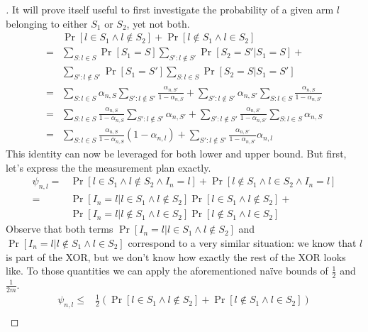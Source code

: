 \begin{proof}[]
  It will prove itself useful to first investigate the probability of a given
  arm $l$ belonging to either $S_1$ or $S_2$, yet not both.
  \begin{align}
    &\Pr[l \in S_1 \wedge l \notin S_2] + \Pr[l \notin S_1 \wedge l \in S_2]  \\
    =& \sum_{S: l \in S} \Pr[S_1 = S] \sum_{S': l \notin S'} \Pr[S_2 = S' | S_1
        = S] + \\
    & \sum_{S': l \notin S'} \Pr[S_1 = S'] \sum_{S: l \in S} \Pr[S_2 = S | S_1
        = S'] \\
    =& \sum_{S: l \in S} \alpha_{n, S} \sum_{S': l \notin S'} \frac{\alpha_{n,
        S'}}{1 - \alpha_{n, S}} + \sum_{S': l \notin S'} \alpha_{n, S'}
        \sum_{S: l \in S} \frac{\alpha_{n, S}}{1 - \alpha_{n, S'}}\\
    =& \sum_{S: l \in S} \frac{\alpha_{n, S}}{1 - \alpha_{n, S}} \sum_{S': l
        \notin S'} \alpha_{n, S'} + \sum_{S': l \notin S'} \frac{\alpha_{n,
        S'}}{1 - \alpha_{n, S'}} \sum_{S: l \in S} \alpha_{n, S}\\
    =& \sum_{S: l \in S} \frac{\alpha_{n, S}}{1 - \alpha_{n, S}} (1 -
        \alpha_{n, l}) +  \sum_{S': l \notin S'} \frac{\alpha_{n, S'}}{1 -
        \alpha_{n, S'}} \alpha_{n, l}
  \end{align}
  This identity can now be leveraged for both lower and upper bound. But first,
  let's express the the measurement plan exactly.
  \begin{align}
    \psi_{n, l} =& \Pr[l \in S_1 \wedge l \notin S_2 \wedge I_n = l] + \Pr[l
        \notin S_1 \wedge l \in S_2 \wedge I_n = l] \\
    =& \Pr[I_n = l | l \in S_1 \wedge l \notin S_2] \Pr[l \in S_1 \wedge l
        \notin S_2] + \\
    & \Pr[I_n = l | l \notin S_1 \wedge l \in S_2] \Pr[l \notin S_1 \wedge l
        \in S_2]
  \end{align}
  Observe that both terms $\Pr[I_n = l | l \in S_1 \wedge l \notin S_2]$ and
  $\Pr[I_n = l | l \notin S_1 \wedge l \in S_2]$ correspond to a very similar
  situation: we know that $l$ is part of the XOR, but we don't know how exactly
  the rest of the XOR looks like. To those quantities we can apply the
  aforementioned naïve bounds of $\frac{1}{2}$ and $\frac{1}{2m}$.
  \begin{align}
    \psi_{n, l} \leq& \frac{1}{2} (\Pr[l \in S_1 \wedge l \notin S_2] + \Pr[l
        \notin S_1 \wedge l \in S_2]) \\

\end{align}
\end{proof}
